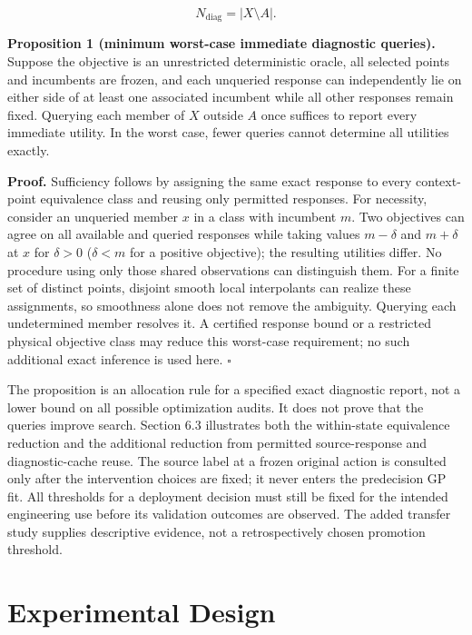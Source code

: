 \documentclass[]{interact}
\begin{document}
\[N_{\mathrm{diag}}=|X\setminus A|.\]

\textbf{Proposition 1 (minimum worst-case immediate diagnostic queries).} Suppose the objective is an unrestricted deterministic oracle, all selected points and incumbents are frozen, and each unqueried response can independently lie on either side of at least one associated incumbent while all other responses remain fixed. Querying each member of \(X\) outside \(A\) once suffices to report every immediate utility. In the worst case, fewer queries cannot determine all utilities exactly.

\textbf{Proof.} Sufficiency follows by assigning the same exact response to every context-point equivalence class and reusing only permitted responses. For necessity, consider an unqueried member \(x\) in a class with incumbent \(m\). Two objectives can agree on all available and queried responses while taking values \(m-\delta\) and \(m+\delta\) at \(x\) for \(\delta>0\) (\(\delta<m\) for a positive objective); the resulting utilities differ. No procedure using only those shared observations can distinguish them. For a finite set of distinct points, disjoint smooth local interpolants can realize these assignments, so smoothness alone does not remove the ambiguity. Querying each undetermined member resolves it. A certified response bound or a restricted physical objective class may reduce this worst-case requirement; no such additional exact inference is used here. $\square$

The proposition is an allocation rule for a specified exact diagnostic report, not a lower bound on all possible optimization audits. It does not prove that the queries improve search. Section 6.3 illustrates both the within-state equivalence reduction and the additional reduction from permitted source-response and diagnostic-cache reuse. The source label at a frozen original action is consulted only after the intervention choices are fixed; it never enters the predecision GP fit. All thresholds for a deployment decision must still be fixed for the intended engineering use before its validation outcomes are observed. The added transfer study supplies descriptive evidence, not a retrospectively chosen promotion threshold.

\hypertarget{experimental-design}{%
\section{Experimental Design}\label{experimental-design}}
\end{document}

